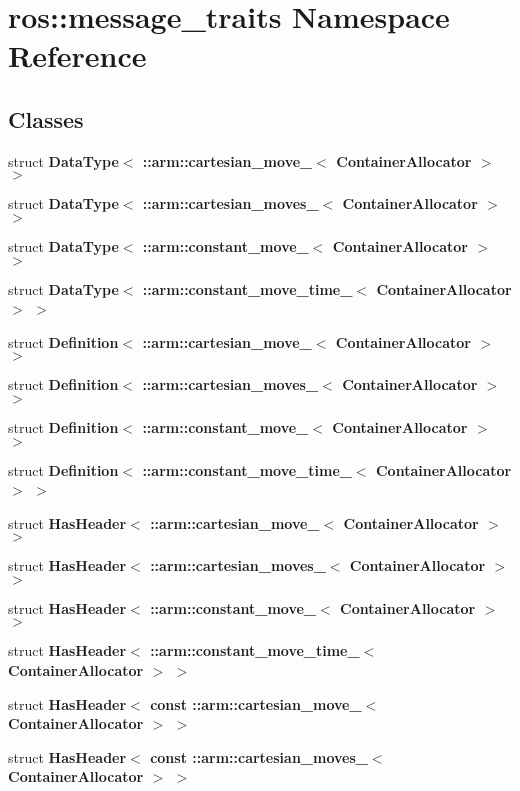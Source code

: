 \section{ros\-:\-:message\-\_\-traits \-Namespace \-Reference}
\label{namespaceros_1_1message__traits}
\subsection*{\-Classes}
\begin{DoxyCompactItemize}
\item 
struct {\bf \-Data\-Type$<$ \-::arm\-::cartesian\-\_\-move\-\_\-$<$ Container\-Allocator $>$ $>$}
\item 
struct {\bf \-Data\-Type$<$ \-::arm\-::cartesian\-\_\-moves\-\_\-$<$ Container\-Allocator $>$ $>$}
\item 
struct {\bf \-Data\-Type$<$ \-::arm\-::constant\-\_\-move\-\_\-$<$ Container\-Allocator $>$ $>$}
\item 
struct {\bf \-Data\-Type$<$ \-::arm\-::constant\-\_\-move\-\_\-time\-\_\-$<$ Container\-Allocator $>$ $>$}
\item 
struct {\bf \-Definition$<$ \-::arm\-::cartesian\-\_\-move\-\_\-$<$ Container\-Allocator $>$ $>$}
\item 
struct {\bf \-Definition$<$ \-::arm\-::cartesian\-\_\-moves\-\_\-$<$ Container\-Allocator $>$ $>$}
\item 
struct {\bf \-Definition$<$ \-::arm\-::constant\-\_\-move\-\_\-$<$ Container\-Allocator $>$ $>$}
\item 
struct {\bf \-Definition$<$ \-::arm\-::constant\-\_\-move\-\_\-time\-\_\-$<$ Container\-Allocator $>$ $>$}
\item 
struct {\bf \-Has\-Header$<$ \-::arm\-::cartesian\-\_\-move\-\_\-$<$ Container\-Allocator $>$ $>$}
\item 
struct {\bf \-Has\-Header$<$ \-::arm\-::cartesian\-\_\-moves\-\_\-$<$ Container\-Allocator $>$ $>$}
\item 
struct {\bf \-Has\-Header$<$ \-::arm\-::constant\-\_\-move\-\_\-$<$ Container\-Allocator $>$ $>$}
\item 
struct {\bf \-Has\-Header$<$ \-::arm\-::constant\-\_\-move\-\_\-time\-\_\-$<$ Container\-Allocator $>$ $>$}
\item 
struct {\bf \-Has\-Header$<$ const \-::arm\-::cartesian\-\_\-move\-\_\-$<$ Container\-Allocator $>$ $>$}
\item 
struct {\bf \-Has\-Header$<$ const \-::arm\-::cartesian\-\_\-moves\-\_\-$<$ Container\-Allocator $>$ $>$}

\end{DoxyCompactItemize}

